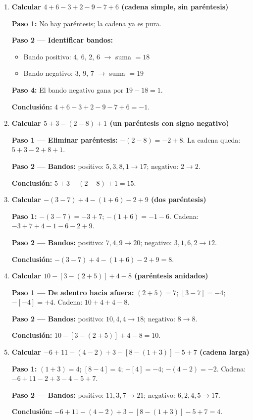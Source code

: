 \documentclass[11pt, letterpaper]{article}
\begin{document}
\begin{tcolorbox}[examplebox, title={Ejemplos --- m\'etodo de la cuerda}]
\begin{enumerate}[label=\textbf{Ej. \arabic*.}, leftmargin=*, itemsep=12pt]

\item \textbf{Calcular $4+6-3+2-9-7+6$ (cadena simple, sin par\'entesis)}

\textbf{Paso 1:} No hay par\'entesis; la cadena ya es pura.

\medskip
\textbf{Paso 2 --- Identificar bandos:}
\begin{itemize}[itemsep=2pt]
  \item Bando positivo: $4,\,6,\,2,\,6$ $\to$ suma $=18$
  \item Bando negativo: $3,\,9,\,7$ $\to$ suma $=19$
\end{itemize}

\medskip
\textbf{Paso 4:} El bando negativo gana por $19-18=1$.

\medskip
\textbf{Conclusi\'on:} $4+6-3+2-9-7+6=-1$.

\item \textbf{Calcular $5+3-(2-8)+1$ (un par\'entesis con signo negativo)}

\textbf{Paso 1 --- Eliminar par\'entesis:} $-(2-8)=-2+8$. La cadena queda: $5+3-2+8+1$.

\medskip
\textbf{Paso 2 --- Bandos:} positivo: $5,3,8,1\to 17$; negativo: $2\to 2$.

\medskip
\textbf{Conclusi\'on:} $5+3-(2-8)+1=15$.

\item \textbf{Calcular $-(3-7)+4-(1+6)-2+9$ (dos par\'entesis)}

\textbf{Paso 1:} $-(3-7)=-3+7$; $-(1+6)=-1-6$. Cadena: $-3+7+4-1-6-2+9$.

\medskip
\textbf{Paso 2 --- Bandos:} positivo: $7,4,9\to 20$; negativo: $3,1,6,2\to 12$.

\medskip
\textbf{Conclusi\'on:} $-(3-7)+4-(1+6)-2+9=8$.

\item \textbf{Calcular $10-[3-(2+5)]+4-8$ (par\'entesis anidados)}

\textbf{Paso 1 --- De adentro hacia afuera:} $(2+5)=7$; $[3-7]=-4$; $-[-4]=+4$. Cadena: $10+4+4-8$.

\medskip
\textbf{Paso 2 --- Bandos:} positivo: $10,4,4\to 18$; negativo: $8\to 8$.

\medskip
\textbf{Conclusi\'on:} $10-[3-(2+5)]+4-8=10$.

\item \textbf{Calcular $-6+11-(4-2)+3-[8-(1+3)]-5+7$ (cadena larga)}

\textbf{Paso 1:} $(1+3)=4$; $[8-4]=4$; $-[4]=-4$; $-(4-2)=-2$. Cadena: $-6+11-2+3-4-5+7$.

\medskip
\textbf{Paso 2 --- Bandos:} positivo: $11,3,7\to 21$; negativo: $6,2,4,5\to 17$.

\medskip
\textbf{Conclusi\'on:} $-6+11-(4-2)+3-[8-(1+3)]-5+7=4$.

\end{enumerate}
\end{tcolorbox}
\end{document}
